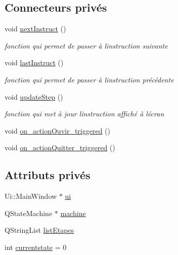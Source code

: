 \subsection*{Connecteurs privés}
\begin{DoxyCompactItemize}
\item 
void \hyperlink{classMainWindow_a0b79b7ea071fc3a4baa45f8394052ffd}{next\+Instruct} ()
\begin{DoxyCompactList}\small\item\em fonction qui permet de passer à l\textquotesingle{}instruction suivante \end{DoxyCompactList}\item 
void \hyperlink{classMainWindow_a715f753a6c46e3f10565a5a1b849ee86}{last\+Instruct} ()
\begin{DoxyCompactList}\small\item\em fonction qui permet de passer à l\textquotesingle{}instruction précédente \end{DoxyCompactList}\item 
void \hyperlink{classMainWindow_a344d21527850380c306fe7ac165321bd}{update\+Step} ()
\begin{DoxyCompactList}\small\item\em fonction qui met à jour l\textquotesingle{}instruction affiché à l\textquotesingle{}écran \end{DoxyCompactList}\item 
void \hyperlink{classMainWindow_a7870a8093d512baa96412b5fcadaaa87}{on\+\_\+action\+Ouvir\+\_\+triggered} ()
\item 
void \hyperlink{classMainWindow_afe9d9d46e61e2460e636619577a9e8fd}{on\+\_\+action\+Quitter\+\_\+triggered} ()
\end{DoxyCompactItemize}
\subsection*{Attributs privés}
\begin{DoxyCompactItemize}
\item 
Ui\+::\+Main\+Window $\ast$ \hyperlink{classMainWindow_a35466a70ed47252a0191168126a352a5}{ui}
\item 
Q\+State\+Machine $\ast$ \hyperlink{classMainWindow_af5f0afb6c5f81e4438f98f93f918ea8b}{machine}
\item 
Q\+String\+List \hyperlink{classMainWindow_a1290f4c9df65fb27c870753aa2b24a88}{list\+Etapes}
\item 
int \hyperlink{classMainWindow_aa7fb75eed49d7eaa019f64577fa11b05}{currentstate} = 0
\end{DoxyCompactItemize}


